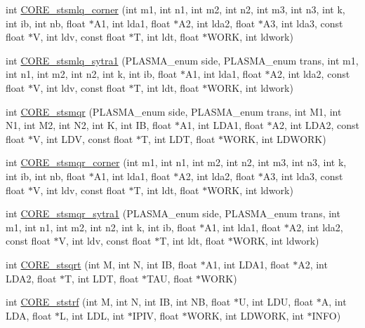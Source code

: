 \begin{DoxyCompactItemize}
int \hyperlink{group__CORE__float_ga7957be0cb2c0d994daf10b0aaf3e816e_ga7957be0cb2c0d994daf10b0aaf3e816e}{C\+O\+R\+E\+\_\+stsmlq\+\_\+corner} (int m1, int n1, int m2, int n2, int m3, int n3, int k, int ib, int nb, float $\ast$A1, int lda1, float $\ast$A2, int lda2, float $\ast$A3, int lda3, const float $\ast$V, int ldv, const float $\ast$T, int ldt, float $\ast$W\+O\+R\+K, int ldwork)
\item 
int \hyperlink{group__CORE__float_ga7766630a8c4976aff74ea95f906d1074_ga7766630a8c4976aff74ea95f906d1074}{C\+O\+R\+E\+\_\+stsmlq\+\_\+sytra1} (P\+L\+A\+S\+M\+A\+\_\+enum side, P\+L\+A\+S\+M\+A\+\_\+enum trans, int m1, int n1, int m2, int n2, int k, int ib, float $\ast$A1, int lda1, float $\ast$A2, int lda2, const float $\ast$V, int ldv, const float $\ast$T, int ldt, float $\ast$W\+O\+R\+K, int ldwork)
\item 
int \hyperlink{group__CORE__float_gaa3e80b39298cc1706f56fa02a5169c80_gaa3e80b39298cc1706f56fa02a5169c80}{C\+O\+R\+E\+\_\+stsmqr} (P\+L\+A\+S\+M\+A\+\_\+enum side, P\+L\+A\+S\+M\+A\+\_\+enum trans, int M1, int N1, int M2, int N2, int K, int I\+B, float $\ast$A1, int L\+D\+A1, float $\ast$A2, int L\+D\+A2, const float $\ast$V, int L\+D\+V, const float $\ast$T, int L\+D\+T, float $\ast$W\+O\+R\+K, int L\+D\+W\+O\+R\+K)
\item 
int \hyperlink{group__CORE__float_gacccdb48be40e881cf4fa9b9cf119efd8_gacccdb48be40e881cf4fa9b9cf119efd8}{C\+O\+R\+E\+\_\+stsmqr\+\_\+corner} (int m1, int n1, int m2, int n2, int m3, int n3, int k, int ib, int nb, float $\ast$A1, int lda1, float $\ast$A2, int lda2, float $\ast$A3, int lda3, const float $\ast$V, int ldv, const float $\ast$T, int ldt, float $\ast$W\+O\+R\+K, int ldwork)
\item 
int \hyperlink{group__CORE__float_gaf9bd7fa9fb3a7fcf7da05d1168452932_gaf9bd7fa9fb3a7fcf7da05d1168452932}{C\+O\+R\+E\+\_\+stsmqr\+\_\+sytra1} (P\+L\+A\+S\+M\+A\+\_\+enum side, P\+L\+A\+S\+M\+A\+\_\+enum trans, int m1, int n1, int m2, int n2, int k, int ib, float $\ast$A1, int lda1, float $\ast$A2, int lda2, const float $\ast$V, int ldv, const float $\ast$T, int ldt, float $\ast$W\+O\+R\+K, int ldwork)
\item 
int \hyperlink{group__CORE__float_ga90fcbf0bf2bf3a532ea025a5f36c3504_ga90fcbf0bf2bf3a532ea025a5f36c3504}{C\+O\+R\+E\+\_\+stsqrt} (int M, int N, int I\+B, float $\ast$A1, int L\+D\+A1, float $\ast$A2, int L\+D\+A2, float $\ast$T, int L\+D\+T, float $\ast$T\+A\+U, float $\ast$W\+O\+R\+K)
\item 
int \hyperlink{group__CORE__float_ga203a0ffc9be2e33f1dffbe9cebfd70ee_ga203a0ffc9be2e33f1dffbe9cebfd70ee}{C\+O\+R\+E\+\_\+ststrf} (int M, int N, int I\+B, int N\+B, float $\ast$U, int L\+D\+U, float $\ast$A, int L\+D\+A, float $\ast$L, int L\+D\+L, int $\ast$I\+P\+I\+V, float $\ast$W\+O\+R\+K, int L\+D\+W\+O\+R\+K, int $\ast$I\+N\+F\+O)

\end{DoxyCompactItemize}
